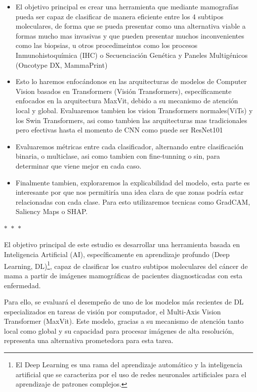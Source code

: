 \documentclass[a4paper,10pt]{book}
\begin{document}
\begin{itemize}
  \item El objetivo principal es crear una herramienta que mediante mamografías pueda ser capaz de clasificar de manera eficiente entre los 4 subtipos moleculares, de forma que se pueda presentar como una alternativa viable a formas mucho mas invasivas y que pueden presentar muchos inconvenientes como las biopsias, u otros procedimeintos como los procesos Inmunohistoquímica (IHC) o Secuenciación Genética y Paneles Multigénicos (Oncotype DX, MammaPrint)
  \item Esto lo haremos enfocándonos en las arquitecturas de modelos de Computer Vision basados en Transformers (Visión Transformers), específicamente enfocados en la arquitectura MaxVit, debido a su mecanismo de atención local y global. Evaluaremos tambien los vision Transformers normales(ViTs) y los Swin Transformers, asi como tambien las arquitecturas mas tradicionales pero efectivas hasta el momento de CNN como puede ser ResNet101
  \item Evaluaremos métricas entre cada clasificador, alternando entre clasificación binaria, o multiclase, asi como tambien con fine-tunning o sin, para determinar que viene mejor en cada caso.
  \item Finalmente tambien, exploraremos la explicabilidad del modelo, esta parte es interesante por que nos permitiría una idea clara de que zonas podría estar relacionadas con cada clase. Para esto utilizaremos tecnicas como GradCAM, Saliency Maps o SHAP.
\end{itemize}

\begin{center}
  $\ast$~$\ast$~$\ast$
\end{center}


El objetivo principal de este estudio es desarrollar una herramienta basada en Inteligencia Artificial (AI), específicamente en aprendizaje profundo (Deep Learning, DL)\footnote{El Deep Learning es una rama del aprendizaje automático y la inteligencia artificial que se caracteriza por el uso de redes neuronales artificiales para el aprendizaje de patrones complejos.}, capaz de clasificar los cuatro subtipos moleculares del cáncer de mama a partir de imágenes mamográficas de pacientes diagnosticadas con esta enfermedad.

Para ello, se evaluará el desempeño de uno de los modelos más recientes de DL especializados en tareas de visión por computador, el Multi-Axis Vision Transformer (MaxVit). Este modelo, gracias a su mecanismo de atención tanto local como global y su capacidad para procesar imágenes de alta resolución, representa una alternativa prometedora para esta tarea.
\end{document}
